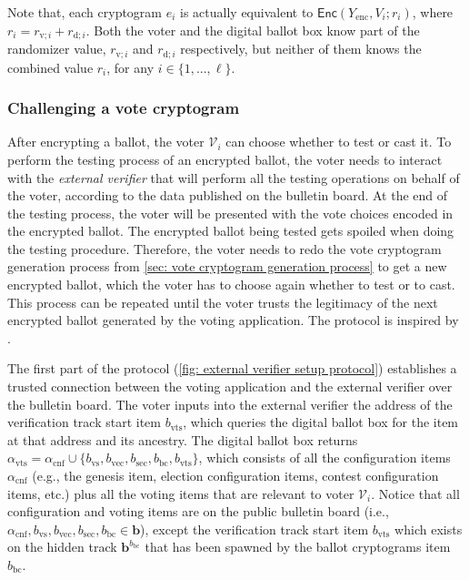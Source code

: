 Note that, each cryptogram $e_i$ is actually equivalent to $\mathsf{Enc}(Y_\mathrm{enc}, V_i; r_i)$, where $r_i = r_{\mathrm{v}; i} + r_{\mathrm{d}; i}$. Both the voter and the digital ballot box know part of the randomizer value, $r_{\mathrm{v}; i}$ and $r_{\mathrm{d}; i}$ respectively, but neither of them knows the combined value $r_i$, for any $i \in \{ 1, ..., \ell \}$.


\clearpage
\subsubsection{Challenging a vote cryptogram} \label{sec: challenging a vote cryptogram}
After encrypting a ballot, the voter $\mathcal{V}_i$ can choose whether to test or cast it. To perform the testing process of an encrypted ballot, the voter needs to interact with the \textit{external verifier} that will perform all the testing operations on behalf of the voter, according to the data published on the bulletin board. At the end of the testing process, the voter will be presented with the vote choices encoded in the encrypted ballot. The encrypted ballot being tested gets spoiled when doing the testing procedure. Therefore, the voter needs to redo the vote cryptogram generation process from \cref{sec: vote cryptogram generation process} to get a new encrypted ballot, which the voter has to choose again whether to test or to cast. This process can be repeated until the voter trusts the legitimacy of the next encrypted ballot generated by the voting application. The protocol is inspired by \cite{Benaloh06}.

The first part of the protocol (\cref{fig: external verifier setup protocol}) establishes a trusted connection between the voting application and the external verifier over the bulletin board. The voter inputs into the external verifier the address of the verification track start item $b_\mathrm{vts}$, which queries the digital ballot box for the item at that address and its ancestry. The digital ballot box returns $\alpha_\mathrm{vts} = \alpha_\mathrm{cnf} \cup \{ b_\mathrm{vs}, b_\mathrm{vec}, b_\mathrm{sec}, b_\mathrm{bc}, b_\mathrm{vts} \}$, which consists of all the configuration items $\alpha_\mathrm{cnf}$ (e.g., the genesis item, election configuration items, contest configuration items, etc.) plus all the voting items that are relevant to voter $\mathcal{V}_i$. Notice that all configuration and voting items are on the public bulletin board (i.e., $\alpha_\mathrm{cnf}, b_\mathrm{vs}, b_\mathrm{vec}, b_\mathrm{sec}, b_\mathrm{bc} \in \boldsymbol{b}$), except the verification track start item $b_\mathrm{vts}$ which exists on the hidden track $\boldsymbol{b}^{b_\mathrm{bc}}$ that has been spawned by the ballot cryptograms item $b_\mathrm{bc}$.

